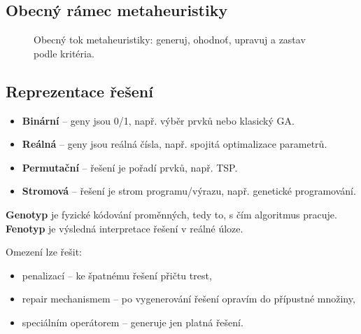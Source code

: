\subsection*{Obecný rámec metaheuristiky}
\begin{figure}[H]
    \centering
    \caption{Obecný tok metaheuristiky: generuj, ohodnoť, upravuj a zastav podle kritéria.}
\end{figure}

\subsection*{Reprezentace řešení}
\begin{itemize}
    \item \textbf{Binární} -- geny jsou 0/1, např. výběr prvků nebo klasický GA.
    \item \textbf{Reálná} -- geny jsou reálná čísla, např. spojitá optimalizace parametrů.
    \item \textbf{Permutační} -- řešení je pořadí prvků, např. TSP.
    \item \textbf{Stromová} -- řešení je strom programu/výrazu, např. genetické programování.
\end{itemize}

\textbf{Genotyp} je fyzické kódování proměnných, tedy to, s čím algoritmus pracuje. \textbf{Fenotyp} je výsledná interpretace řešení v reálné úloze.

Omezení lze řešit:
\begin{itemize}
    \item penalizací -- ke špatnému řešení přičtu trest,
    \item repair mechanismem -- po vygenerování řešení opravím do přípustné množiny,
    \item speciálním operátorem -- generuje jen platná řešení.
\end{itemize}

